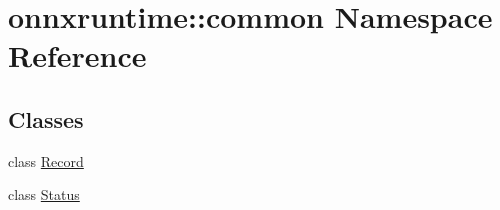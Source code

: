 \hypertarget{namespaceonnxruntime_1_1common}{}\section{onnxruntime\+:\+:common Namespace Reference}
\label{namespaceonnxruntime_1_1common}
\subsection*{Classes}
\begin{DoxyCompactItemize}
\item 
class \mbox{\hyperlink{classonnxruntime_1_1common_1_1Record}{Record}}
\item 
class \mbox{\hyperlink{classonnxruntime_1_1common_1_1Status}{Status}}
\end{DoxyCompactItemize}
